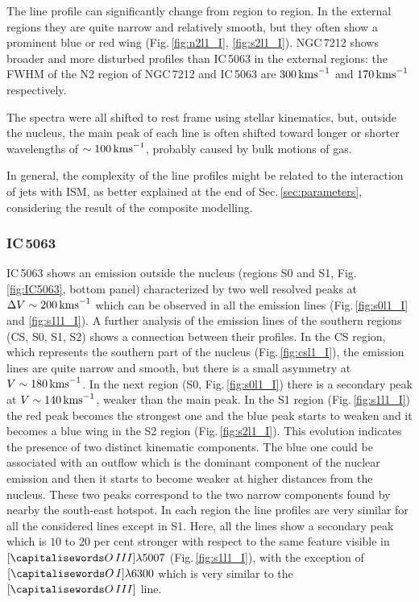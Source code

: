 \documentclass[../thesis.tex]{subfiles}
\begin{document}
The line profile can significantly change from region to region.
In the external regions they are quite narrow and relatively smooth, but they often show a prominent blue or red wing (Fig.\,\ref{fig:n2l1_I}, \ref{fig:s2l1_I}).
NGC\,7212 shows broader and more disturbed profiles than IC\,5063 in the external regions: the FWHM of the N2 region of NGC\,7212 and IC\,5063 are $300\,\si{\kms}$ and $170\,\si{\kms}$ respectively.

The spectra were all shifted to rest frame using stellar kinematics, but, outside the nucleus, the main peak of each line is often shifted toward longer or shorter wavelengths of $\sim100\,\si{\kms}$, probably caused by bulk motions of gas.

In general, the complexity of the line profiles might be related to the interaction of jets with ISM, as better explained at the end of Sec.\,\ref{sec:parameters}, considering the result of the composite modelling.


\subsubsection{IC\,5063}
IC\,5063 shows an emission outside the nucleus (regions S0 and S1, Fig.\,\ref{fig:IC5063}, bottom panel) characterized by two well resolved peaks at $\Delta V\sim 200\,\si{\kms}$ which can be observed in all the emission lines (Fig.\,\ref{fig:s0l1_I} and \ref{fig:s1l1_I}).
A further analysis of the emission lines of the southern regions (CS, S0, S1, S2) shows a connection between their profiles.
In the CS region, which represents the southern part of the nucleus (Fig.\,\ref{fig:csl1_I}), the emission lines are quite narrow and smooth, but there is a small asymmetry at $V\sim 180\,\si{\kms}$.
In the next region (S0, Fig.\,\ref{fig:s0l1_I}) there is a secondary peak at $V\sim 140\,\si{\kms}$, weaker than the main peak.  
In the S1 region (Fig.\,\ref{fig:s1l1_I}) the red peak becomes the strongest one and the blue peak starts to weaken and it becomes a blue wing in the S2 region (Fig.\,\ref{fig:s2l1_I}).
This evolution indicates the presence of two distinct kinematic components.
The blue one could be associated with an outflow which is the dominant component of the nuclear emission and then it starts to become weaker at higher distances from the nucleus.
These two peaks correspond to the two narrow components found by \citet{Morganti07} nearby the south-east hotspot.
In each region the line profiles are very similar for all the considered lines except in S1.
Here, all the lines show a secondary peak which is $10$ to $20$ per cent stronger with respect to the same feature visible in $[\ion{O}{III}]\lambda5007$  (Fig.\,\ref{fig:s1l1_I}), with the exception of $[\ion{O}{I}]\lambda6300$ which is very similar to the $[\ion{O}{III}]$ line.
\end{document}
